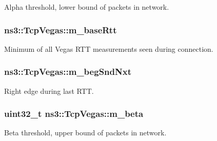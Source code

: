 Alpha threshold, lower bound of packets in network. 

\subsubsection[{\texorpdfstring{m\+\_\+base\+Rtt}{m_baseRtt}}]{ ns3\+::\+Tcp\+Vegas\+::m\+\_\+base\+Rtt\hspace{0.3cm}{\ttfamily [private]}}\hypertarget{classns3_1_1TcpVegas_ae283bcc32d2d92002477abafd1ca5132}{}\label{classns3_1_1TcpVegas_ae283bcc32d2d92002477abafd1ca5132}


Minimum of all Vegas R\+TT measurements seen during connection. 

\subsubsection[{\texorpdfstring{m\+\_\+beg\+Snd\+Nxt}{m_begSndNxt}}]{ ns3\+::\+Tcp\+Vegas\+::m\+\_\+beg\+Snd\+Nxt\hspace{0.3cm}{\ttfamily [private]}}\hypertarget{classns3_1_1TcpVegas_affe4c208f73217f8f29380b91d287ed8}{}\label{classns3_1_1TcpVegas_affe4c208f73217f8f29380b91d287ed8}


Right edge during last R\+TT. 

\subsubsection[{\texorpdfstring{m\+\_\+beta}{m_beta}}]{\setlength{\rightskip}{0pt plus 5cm}uint32\+\_\+t ns3\+::\+Tcp\+Vegas\+::m\+\_\+beta\hspace{0.3cm}{\ttfamily [private]}}\hypertarget{classns3_1_1TcpVegas_a5871bf3ef55a392819a26c80f8c0a87f}{}\label{classns3_1_1TcpVegas_a5871bf3ef55a392819a26c80f8c0a87f}


Beta threshold, upper bound of packets in network. 

